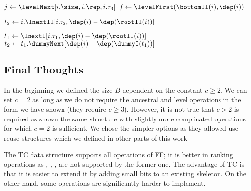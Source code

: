 \begin{algorithm}
\begin{algorithmic}
		\State {}
	\EndIf
	
	\State $j \gets \levelNext[i.\size, i.\rep, i.\tau_3]$ 
		\State $f \gets \levelFirst(\bottomII(i), \dep(i))$  
			\State {}
		\EndIf
		\State {} 
	\EndIf
	
	\State $t_2 \gets i.\lnextII[i.\tau_2, \dep(i) - \dep(\rootII(i))]$ 
		\State {}
		\State {}
	\EndIf
	
	\State $t_1 \gets \lnextI[i.\tau_1, \dep(i) - \dep(\rootII(i))]$ 
		\State $t_2 \gets t_1.\dummyNext[\dep(i) - \dep(\dummyI(t_1))]$
			\State {}
		\Else
			\State {}
		\EndIf
		\State {}
	\Else
		\State {}
	\EndIf
\EndFunction
\end{algorithmic}
\end{algorithm}

\subsection{Final Thoughts}

In the beginning we defined the size $B$ dependent on the constant $c \ge 2$.
We can set $c = 2$ as long as we do not require the ancestral and level operations in the form we have shown (they require $c \ge 3$).
However, it is not true that $c >2$ is required as  shown the same structure with slightly more complicated operations for which $c = 2$ is sufficient.
We chose the simpler options as they allowed use reuse structures which we defined in other parts of this work.

The TC data structure supports all operations of FF; it is better in ranking operations as \postRank{}, \postSelect{}, \dfudsRank{}, \dfudsSelect{} are not supported by the former one.
The advantage of TC is that it is easier to extend it by adding small bits to an existing skeleton.
On the other hand, some operations are significantly harder to implement.

